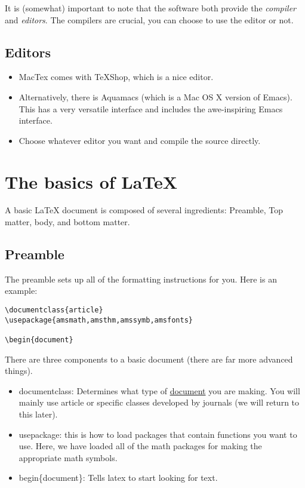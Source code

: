 \documentclass{article}
\begin{document}
It is (somewhat) important to note that the software both provide the {\em compiler} and {\em editors}.  The compilers are crucial,
you can choose to use the editor or not.

\subsection{Editors}
\begin{itemize}
\item MacTex comes with TeXShop, which is a nice editor.
\item Alternatively, there is Aquamacs (which is a Mac OS X version of Emacs).   This has a very versatile interface and 
includes the awe-inspiring Emacs interface.
\item Choose whatever editor you want and compile the source directly.
\end{itemize}

\section{The basics of \LaTeX{}}
A basic \LaTeX{} document is composed of several ingredients: Preamble, Top matter, body, and bottom matter.
\subsection{Preamble}
The preamble sets up all of the formatting instructions for you.  Here is an example:

\begin{verbatim}
\documentclass{article}
\usepackage{amsmath,amsthm,amssymb,amsfonts}

\begin{document}
\end{verbatim}

There are three components to a basic document (there are far more advanced things).

\begin{itemize}
\item documentclass: Determines what type of \href{http://en.wikibooks.org/wiki/LaTeX/Document_Structure#Document_classes}{document} you are making.  You will mainly use article or specific classes developed by journals (we will return to this later).
\item usepackage: this is how to load packages that contain functions you want to use.  Here, we have loaded all of the math packages for making the appropriate math symbols.
\item begin\{document\}:  Tells latex to start looking for text.
\end{itemize}
\end{document}
